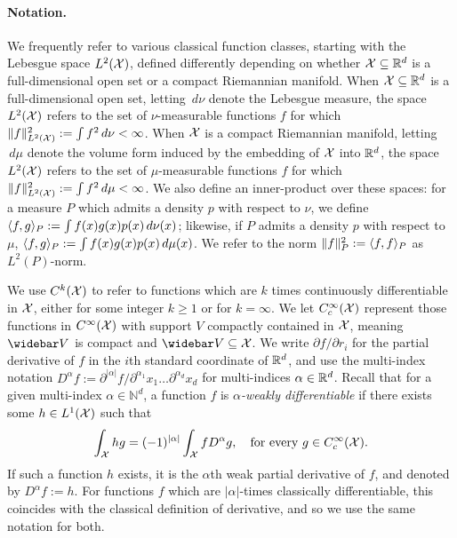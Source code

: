 \paragraph{Notation.}
We frequently refer to various classical function classes, starting with the Lebesgue space $L^2(\mathcal{X})$, defined differently depending on whether $\mathcal{X} \subseteq \mathbb{R}^d$ is a full-dimensional open set or a compact Riemannian manifold. When $\mathcal{X} \subseteq \mathbb{R}^d$ is a full-dimensional open set, letting $\,d\nu$ denote the Lebesgue measure, the space $L^2(\mathcal{X})$ refers to the set of $\nu$-measurable functions $f$ for which $\|f\|_{L^2(\mathcal{X})}^2 := \int f^2 \,d\nu  < \infty$. When $\mathcal{X}$ is a compact Riemannian manifold, letting $\,d\mu$ denote the volume form induced by the embedding of $\mathcal{X}$ into $\mathbb{R}^d$, the space $L^2(\mathcal{X})$ refers to the set of $\mu$-measurable functions $f$ for which $\|f\|_{L^2(\mathcal{X})}^2 := \int f^2 \,d\mu  < \infty$. We also define an inner-product over these spaces: for a measure $P$ which admits a density $p$ with respect to $\nu$, we define $\langle f, g \rangle_P := \int f(x)g(x)p(x) \,d\nu(x)$; likewise, if $P$ admits a density $p$ with respect to $\mu$, $\langle f, g \rangle_P := \int f(x)g(x)p(x) \,d\mu(x)$. We refer to the norm $\|f\|_P^2 := \langle f, f \rangle_{P}$ as $L^2(P)$-norm.

We use $C^k(\mathcal{X})$ to refer to functions which are $k$ times continuously differentiable in $\mathcal{X}$, either for some integer $k \geq 1$ or for $k = \infty$. We let $C_c^{\infty}(\mathcal{X})$ represent those functions in $C^{\infty}(\mathcal{X})$ with support $V$ compactly contained in $\mathcal{X}$, meaning $\wb{V}$ is compact and $\wb{V} \subseteq \mc{X}$. We write $\partial f/\partial r_i$ for the partial derivative of $f$ in the $i$th standard coordinate of $\mathbb{R}^d$, and use the multi-index notation $D^{\alpha}f := \partial^{|\alpha|}f/\partial^{\alpha_1}x_1\ldots\partial^{\alpha_d}x_d$ for multi-indices $\alpha \in \mathbb{R}^d$. Recall that for a given multi-index $\alpha \in \mathbb{N}^d$, a function $f$ is \emph{$\alpha$-weakly differentiable} if there exists some $h \in L^1(\mathcal{X})$ such that
\begin{equation*}
\int_{\mathcal{X}} h g = (-1)^{|\alpha|} \int_{\mathcal{X}} f D^{\alpha}g, \quad \textrm{for every $g \in C_c^{\infty}(\mathcal{X})$.}
\end{equation*}
If such a function $h$ exists, it is the $\alpha$th weak partial derivative of $f$, and denoted by $D^{\alpha}f := h$. For functions $f$ which are $|\alpha|$-times classically differentiable, this coincides with the classical definition of derivative, and so we use the same notation for both.

